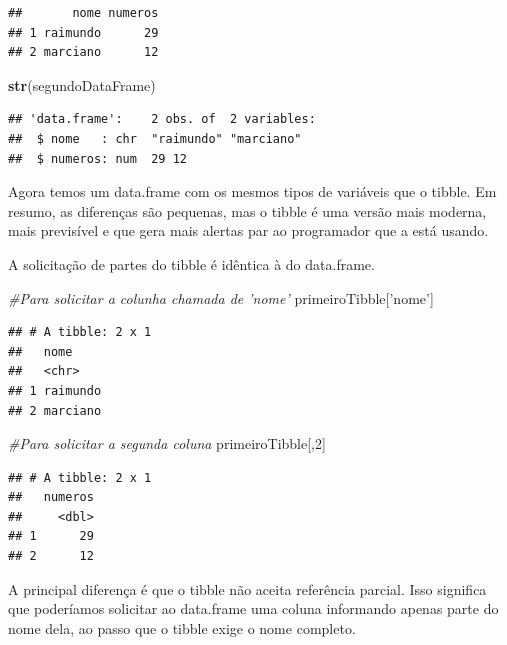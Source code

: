 \documentclass[
]{book}
\newenvironment{Shaded}{\begin{snugshade}}{\end{snugshade}}
\newcommand{\CommentTok}[1]{\textcolor[rgb]{0.56,0.35,0.01}{\textit{#1}}}
\newcommand{\DecValTok}[1]{\textcolor[rgb]{0.00,0.00,0.81}{#1}}
\newcommand{\KeywordTok}[1]{\textcolor[rgb]{0.13,0.29,0.53}{\textbf{#1}}}
\newcommand{\NormalTok}[1]{#1}
\newcommand{\StringTok}[1]{\textcolor[rgb]{0.31,0.60,0.02}{#1}}
\begin{document}
\begin{verbatim}
##       nome numeros
## 1 raimundo      29
## 2 marciano      12
\end{verbatim}

\begin{Shaded}
\begin{Highlighting}[]
\KeywordTok{str}\NormalTok{(segundoDataFrame)}
\end{Highlighting}
\end{Shaded}

\begin{verbatim}
## 'data.frame':    2 obs. of  2 variables:
##  $ nome   : chr  "raimundo" "marciano"
##  $ numeros: num  29 12
\end{verbatim}

Agora temos um data.frame com os mesmos tipos de variáveis que o tibble. Em resumo, as diferenças são pequenas, mas o tibble é uma versão mais moderna, mais previsível e que gera mais alertas par ao programador que a está usando.

A solicitação de partes do tibble é idêntica à do data.frame.

\begin{Shaded}
\begin{Highlighting}[]
\CommentTok{#Para solicitar a colunha chamada de 'nome'}
\NormalTok{primeiroTibble[}\StringTok{'nome'}\NormalTok{]}
\end{Highlighting}
\end{Shaded}

\begin{verbatim}
## # A tibble: 2 x 1
##   nome    
##   <chr>   
## 1 raimundo
## 2 marciano
\end{verbatim}

\begin{Shaded}
\begin{Highlighting}[]
\CommentTok{#Para solicitar a segunda coluna}
\NormalTok{primeiroTibble[,}\DecValTok{2}\NormalTok{]}
\end{Highlighting}
\end{Shaded}

\begin{verbatim}
## # A tibble: 2 x 1
##   numeros
##     <dbl>
## 1      29
## 2      12
\end{verbatim}

A principal diferença é que o tibble não aceita referência parcial. Isso significa que poderíamos solicitar ao data.frame uma coluna informando apenas parte do nome dela, ao passo que o tibble exige o nome completo.
\end{document}
